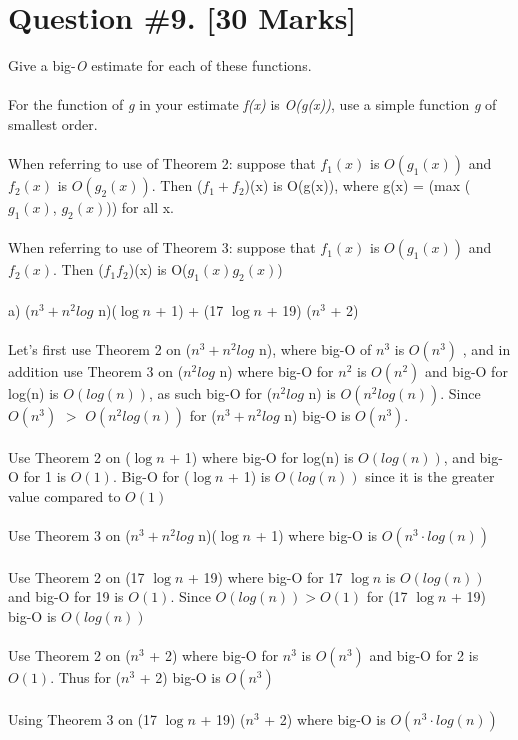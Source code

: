 \documentclass{article}
\begin{document}
{\section{Question \#9. [30 Marks]}
Give a big-\emph{O} estimate for each of these functions. \\ \\ 
For the function of \emph{g} in your estimate \emph{f(x)} is \emph{O(g(x))}, use a simple function \emph{g} of smallest order. \\ \\ 
When referring to use of Theorem 2: suppose that $f_{1}(x)$ is $O(g_{1}(x))$ and $f_{2}(x)$ is $O(g_{2} (x))$. Then  ($f_{1} + f_{2}$)(x) is O(g(x)), where g(x) = (max ($g_{1}(x)$, $g_{2}(x)$)) for all x. \\\\
When referring to use of Theorem 3: suppose that $f_{1}(x)$ is $O(g_{1}(x))$ and $f_{2}(x)$. Then ($f_{1}f_{2}$)(x) is O($g_{1}(x)$$g_{2}(x)$) \\\\
a) ($n^3 + n^2log$ n)($\log{n}$ + 1) + (17 $\log{n}$ + 19) ($n^3$ + 2) \\ \\ 
Let's first use Theorem 2 on ($n^3 + n^2log$ n), where big-O of $n^3$ is $O{(n^3)}$ , and in addition use Theorem 3 on ($n^2log$ n) where big-O for $n^2$ is $O(n^2)$ and big-O for log(n) is $O(log(n))$, as such big-O for ($n^2log$ n) is $O(n^2log(n))$. Since $O(n^3)$ $>$ $O(n^2log(n))$ for ($n^3 + n^2log$ n) big-O is $O(n^3)$. \\\\
Use Theorem 2 on ($\log{n}$ + 1) where big-O for log(n) is $O(log(n))$, and big-O for 1 is $O(1)$. Big-O for  ($\log{n}$ + 1) is $O(log(n))$ since it is the greater value compared to $O(1)$ \\ \\
Use Theorem 3 on ($n^3 + n^2log$ n)($\log{n}$ + 1) where big-O is $O(n^3 \cdot log (n))$\\ \\
Use Theorem 2 on  (17 $\log{n}$ + 19) where big-O for 17 $\log{n}$ is $O(log(n))$ and big-O for 19 is $O(1)$. Since $O(log(n)) > O(1) $ for (17 $\log{n}$ + 19) big-O is $O(log(n))$   \\\\
Use Theorem 2 on ($n^3$ + 2) where big-O for $n^3$ is $O(n^3)$ and big-O for 2 is $O(1)$. Thus for ($n^3$ + 2) big-O is $O(n^3)$  \\\\
Using Theorem 3 on  (17 $\log{n}$ + 19) ($n^3$ + 2) where big-O is $O(n^3 \cdot log(n))$ \\\\
$$}
\end{document}
